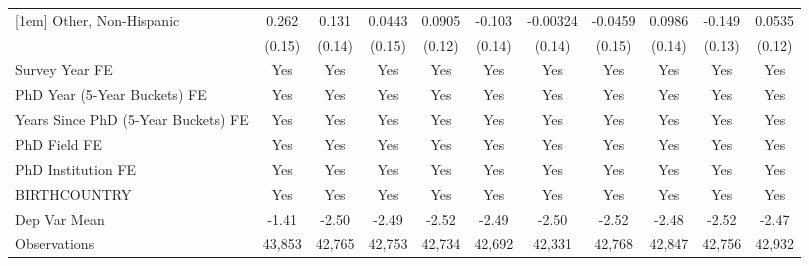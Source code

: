 \begin{table}[htbp]
\begin{tabular}{l*{10}{c}}
[1em]
Other, Non-Hispanic&       0.262\sym{*}  &       0.131         &      0.0443         &      0.0905         &      -0.103         &    -0.00324         &     -0.0459         &      0.0986         &      -0.149         &      0.0535         \\
  &      (0.15)         &      (0.14)         &      (0.15)         &      (0.12)         &      (0.14)         &      (0.14)         &      (0.15)         &      (0.14)         &      (0.13)         &      (0.12)         \\
[1em]
Survey Year FE&         Yes         &         Yes         &         Yes         &         Yes         &         Yes         &         Yes         &         Yes         &         Yes         &         Yes         &         Yes         \\
[1em]
PhD Year (5-Year Buckets) FE&         Yes         &         Yes         &         Yes         &         Yes         &         Yes         &         Yes         &         Yes         &         Yes         &         Yes         &         Yes         \\
[1em]
Years Since PhD (5-Year Buckets) FE&         Yes         &         Yes         &         Yes         &         Yes         &         Yes         &         Yes         &         Yes         &         Yes         &         Yes         &         Yes         \\
[1em]
PhD Field FE&         Yes         &         Yes         &         Yes         &         Yes         &         Yes         &         Yes         &         Yes         &         Yes         &         Yes         &         Yes         \\
[1em]
PhD Institution FE&         Yes         &         Yes         &         Yes         &         Yes         &         Yes         &         Yes         &         Yes         &         Yes         &         Yes         &         Yes         \\
[1em]
BIRTHCOUNTRY&         Yes         &         Yes         &         Yes         &         Yes         &         Yes         &         Yes         &         Yes         &         Yes         &         Yes         &         Yes         \\
\hline
Dep Var Mean&       -1.41         &       -2.50         &       -2.49         &       -2.52         &       -2.49         &       -2.50         &       -2.52         &       -2.48         &       -2.52         &       -2.47         \\
Observations&      43,853         &      42,765         &      42,753         &      42,734         &      42,692         &      42,331         &      42,768         &      42,847         &      42,756         &      42,932         \\

\end{tabular}
\end{table}

